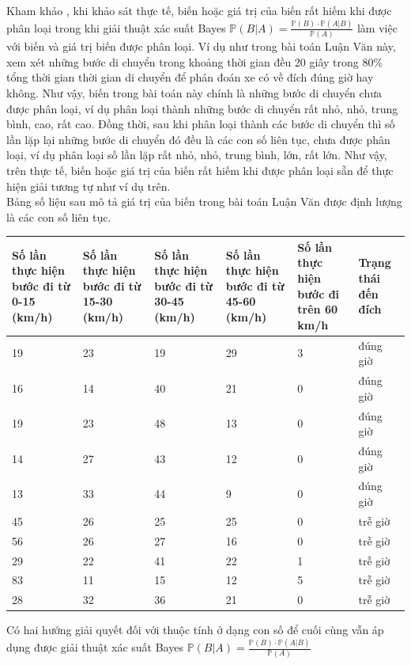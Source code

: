 \documentclass[a4paper, 13pt]{report}
\begin{document}
Kham khảo \cite{2WAYSOFNB}, khi khảo sát thực tế, biến hoặc giá trị của biến rất hiếm khi được phân loại trong khi giải thuật xác suất Bayes $\mathbb{P}(B|A) = \frac{\mathbb{P}(B) \cdot \mathbb{P}(A|B)}{\mathbb{P}(A)}$ làm việc với biến và giá trị biến được phân loại. Ví dụ như trong bài toán Luận Văn này, xem xét những bước di chuyển trong khoảng thời gian đều 20 giây trong 80\% tổng thời gian thời gian di chuyển để phán đoán xe có về đích đúng giờ hay không. Như vậy, biến trong bài toán này chính là những bước di chuyển chưa được phân loại, ví dụ phân loại thành những bước di chuyển rất nhỏ, nhỏ, trung bình, cao, rất cao. Đồng thời, sau khi phân loại thành các bước di chuyển thì số lần lặp lại những bước di chuyển đó đều là các con số liên tục, chưa được phân loại, ví dụ phân loại số lần lặp rất nhỏ, nhỏ, trung bình, lớn, rất lớn. Như vậy, trên thực tế, biến hoặc giá trị của biến rất hiếm khi được phân loại sẵn để thực hiện giải tương tự như ví dụ trên.\\
Bảng số liệu sau mô tả giá trị của biến trong bài toán Luận Văn được định lượng là các con số liên tục.
\begin{flushleft}
\begin{tabular}{|p{2.6cm}|p{2.6cm}|p{2.6cm}|p{2.6cm}|p{2.6cm}|p{1.5cm}|}
\hline
Số lần thực hiện bước đi từ 0-15 (km/h)& Số lần thực hiện bước đi từ 15-30 (km/h) & Số lần thực hiện bước đi từ 30-45 (km/h) & Số lần thực hiện bước đi từ 45-60 (km/h) & Số lần thực hiện bước đi trên 60 km/h & Trạng thái đến đích \\ 
\hline
19 & 23 & 19 & 29 & 3 & đúng giờ\\
\hline
16 & 14 & 40 & 21 & 0 & đúng giờ\\
\hline
19 & 23 & 48 & 13 & 0 & đúng giờ\\
\hline
14 & 27 & 43 & 12 & 0 & đúng giờ\\
\hline
13 & 33 & 44 & 9 & 0 & đúng giờ \\
\hline
45 & 26 & 25 & 25 & 0 & trễ giờ\\
\hline
56 & 26 & 27 & 16 & 0 & trễ giờ\\
\hline
29 & 22 & 41 & 22 & 1 & trễ giờ\\
\hline
83 & 11 & 15 & 12 & 5 & trễ giờ\\
\hline
28 & 32 & 36 & 21 & 0 & trễ giờ\\
\hline
\end{tabular}
\end{flushleft}
Có hai hướng giải quyết đối với thuộc tính ở dạng con số để cuối cùng vẫn áp dụng được giải thuật xác suất Bayes $\mathbb{P}(B|A) = \frac{\mathbb{P}(B) \cdot \mathbb{P}(A|B)}{\mathbb{P}(A)}$\\
\end{document}
